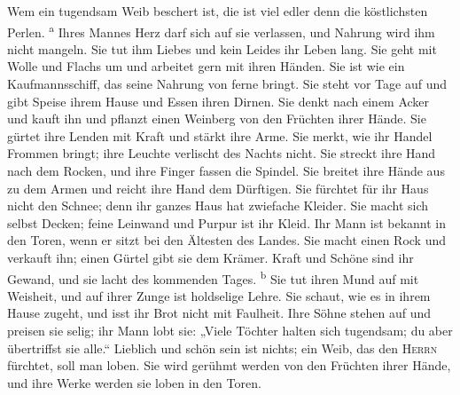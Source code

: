  Wem ein tugendsam Weib beschert ist, die ist viel edler
denn die köstlichsten Perlen. \textsuperscript{a}  Ihres
Mannes Herz darf sich auf sie verlassen, und Nahrung wird ihm nicht
mangeln.  Sie tut ihm Liebes und kein Leides ihr Leben
lang.  Sie geht mit Wolle und Flachs um und arbeitet gern
mit ihren Händen.  Sie ist wie ein Kaufmannsschiff, das
seine Nahrung von ferne bringt.  Sie steht vor Tage auf
und gibt Speise ihrem Hause und Essen ihren Dirnen.  Sie
denkt nach einem Acker und kauft ihn und pflanzt einen Weinberg von den
Früchten ihrer Hände.  Sie gürtet ihre Lenden mit Kraft
und stärkt ihre Arme.  Sie merkt, wie ihr Handel Frommen
bringt; ihre Leuchte verlischt des Nachts nicht.  Sie
streckt ihre Hand nach dem Rocken, und ihre Finger fassen die Spindel.
 Sie breitet ihre Hände aus zu dem Armen und reicht ihre
Hand dem Dürftigen.  Sie fürchtet für ihr Haus nicht den
Schnee; denn ihr ganzes Haus hat zwiefache Kleider.  Sie
macht sich selbst Decken; feine Leinwand und Purpur ist ihr Kleid.
 Ihr Mann ist bekannt in den Toren, wenn er sitzt bei den
Ältesten des Landes.  Sie macht einen Rock und verkauft
ihn; einen Gürtel gibt sie dem Krämer.  Kraft und Schöne
sind ihr Gewand, und sie lacht des kommenden Tages. \textsuperscript{b}
 Sie tut ihren Mund auf mit Weisheit, und auf ihrer Zunge
ist holdselige Lehre.  Sie schaut, wie es in ihrem Hause
zugeht, und isst ihr Brot nicht mit Faulheit.  Ihre Söhne
stehen auf und preisen sie selig; ihr Mann lobt sie: 
„Viele Töchter halten sich tugendsam; du aber übertriffst sie alle.``
 Lieblich und schön sein ist nichts; ein Weib, das den
\textsc{Herrn} fürchtet, soll man loben.  Sie wird
gerühmt werden von den Früchten ihrer Hände, und ihre Werke werden sie
loben in den Toren.
